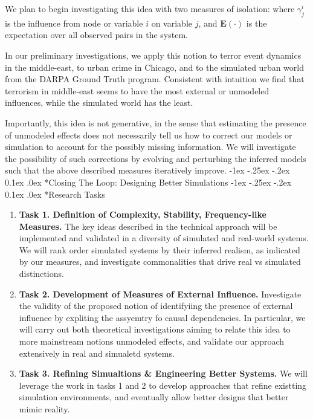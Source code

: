 \documentclass[onecolumn, compsoc,11pt]{IEEEtran}
\makeatletter
\renewcommand\subsection{\@startsection {section}{1}{\z@}%
  {-1ex \@plus -.25ex \@minus -.2ex}%
  {0.1ex \@plus.0ex}%
  {\fontsize{11}{10}\selectfont\bfseries\sffamily\color{DodgerBlue4}}}
\newcommand{\tball}[1][CadetBlue4]{${\color{#1}\Large\boldsymbol{\blacksquare}}$}
\makeatother
\begin{document}
We plan to begin investigating this idea with two measures of isolation:
where $\gamma^i_j$ is the influence from node or variable $i$ on variable $j$, and $\mathbf{E}(\cdot) $ is the expectation over all observed pairs in the system.

In our preliminary investigations, we apply this notion to terror event dynamics in the middle-east, to urban crime in Chicago, and to the simulated urban world from the DARPA Ground Truth program. Consistent with intuition we find that terrorism in middle-east seems to have the most external or unmodeled influences, while the simulated world has the least.

Importantly, this idea is not generative, in the sense that estimating the presence of unmodeled effects does not necessarily tell us how to correct our models or simulation to account for the possibly missing information. We will investigate the possibility of such corrections by evolving and perturbing the inferred models such that the above described measures iteratively improve.
%
\subsection*{Closing The Loop: Designing Better Simulations }
\subsection*{Research Tasks}
\begin{enumerate}
  [label=\tball, leftmargin=0pt,
  labelindent=0em, topsep=0.1em, labelsep=*, itemsep=.15em,itemindent=2em]\color{black} \sffamily\fontsize{11}{12}\selectfont
\item  \textbf{Task 1. Definition of Complexity, Stability, Frequency-like Measures.}  The key ideas described in the technical approach will be implemented and validated in a diversity of simulated and real-world systems. We will rank order simulated systems by their inferred realism, as indicated by our measures, and investigate commonalities that drive real vs simulated distinctions.
\item  \textbf{Task 2. Development of Measures of External Influence.}
 Investigate the validity of the proposed notion of identifyiing the presence of external influence by expliting the assyemtry fo causal dependencies. In particular, we will carry out both theoretical investigations aiming to relate this idea to more mainstream notions unmodeled effects, and validate our approach extensively in real and simualetd systems.
\item \textbf{Task 3. Refining Simualtions \& Engineering Better Systems. } We will leverage the work in tasks 1 and 2 to develop approaches that refine existting simulation environments, and eventually allow better designs that better mimic reality. 
\end{enumerate}
\end{document}
